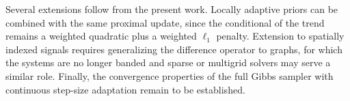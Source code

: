 Several extensions follow from the present work. Locally adaptive priors can be combined with the same proximal update, since the conditional of the trend remains a weighted quadratic plus a weighted $\ell_1$ penalty. Extension to spatially indexed signals requires generalizing the difference operator to graphs, for which the systems are no longer banded and sparse or multigrid solvers may serve a similar role. Finally, the convergence properties of the full Gibbs sampler with continuous step-size adaptation remain to be established.
